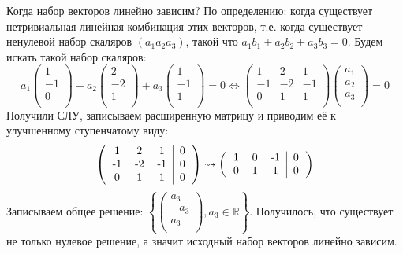 \documentclass[a4paper,11pt]{report}
\begin{document}
Когда набор векторов линейно зависим? По определению: когда существует нетривиальная линейная комбинация этих векторов, 
т.е. когда существует ненулевой набор скаляров $(a_1 a_2 a_3)$, такой что $a_1b_1 + a_2b_2 + a_3b_3 = 0$. Будем искать такой набор
скаляров:
\[
a_1
\begin{pmatrix}
1\\
-1\\
0\\
\end{pmatrix}
+ a_2
\begin{pmatrix}
2\\
-2\\
1\\
\end{pmatrix}
+ a_3
\begin{pmatrix}
1\\
-1\\
1\\
\end{pmatrix}
= 0
\Leftrightarrow
\begin{pmatrix}
1 & 2 & 1\\
-1 & -2 & -1\\
0 & 1 & 1\\
\end{pmatrix}
\begin{pmatrix}
a_1\\
a_2\\
a_3\\
\end{pmatrix}
=0
\]
Получили СЛУ, записываем расширенную матрицу и приводим её к улучшенному ступенчатому виду:
\[
\begin{pmatrix}
\begin{tabular}{c c c | c}
1 & 2 & 1 & 0\\
-1 & -2 & -1 & 0\\
0 & 1 & 1 & 0\\
\end{tabular}
\end{pmatrix}
\rightsquigarrow
\begin{pmatrix}
\begin{tabular}{c c c | c}
1 & 0 & -1 & 0\\
0 & 1 & 1 & 0\\
\end{tabular}
\end{pmatrix}
\]
Записываем общее решение: $
\left\{
\begin{pmatrix}
a_3\\
-a_3\\
a_3\\
\end{pmatrix}
, a_3 \in \mathbb{R}
\right\}$. Получилось, что существует не только нулевое решение, а значит исходный набор векторов линейно зависим.
\\
\\
\end{document}
